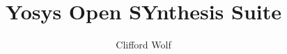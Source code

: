 \documentclass{beamer}
\title{Yosys Open SYnthesis Suite}
\author{Clifford Wolf}
\begin{document}
\begin{frame}
\titlepage
\end{frame}


\end{document}

